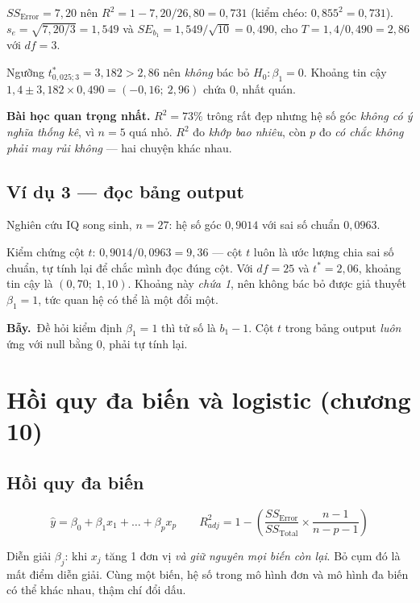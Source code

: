 \documentclass[11pt]{article}
\newcommand{\bay}{\textbf{Bẫy.}\ }
\begin{document}
$SS_{\text{Error}} = 7{,}20$ nên $R^2 = 1 - 7{,}20/26{,}80 = 0{,}731$
(kiểm chéo: $0{,}855^2 = 0{,}731$).
$s_e = \sqrt{7{,}20/3} = 1{,}549$ và $SE_{b_1} = 1{,}549/\sqrt{10} = 0{,}490$, cho
$T = 1{,}4/0{,}490 = 2{,}86$ với $df=3$.

Ngưỡng $t^{*}_{0{,}025;3} = 3{,}182 > 2{,}86$ nên \emph{không} bác bỏ
$H_0: \beta_1 = 0$. Khoảng tin cậy
$1{,}4 \pm 3{,}182 \times 0{,}490 = (-0{,}16;\ 2{,}96)$ chứa 0, nhất quán.

\textbf{Bài học quan trọng nhất.} $R^2 = 73\%$ trông rất đẹp nhưng hệ số góc
\emph{không có ý nghĩa thống kê}, vì $n=5$ quá nhỏ. $R^2$ đo \emph{khớp bao
nhiêu}, còn $p$ đo \emph{có chắc không phải may rủi không} --- hai chuyện khác nhau.

\subsection*{Ví dụ 3 --- đọc bảng output}

Nghiên cứu IQ song sinh, $n=27$: hệ số góc $0{,}9014$ với sai số chuẩn $0{,}0963$.

Kiểm chứng cột $t$: $0{,}9014/0{,}0963 = 9{,}36$ --- cột $t$ luôn là ước lượng chia
sai số chuẩn, tự tính lại để chắc mình đọc đúng cột. Với $df = 25$ và
$t^{*} = 2{,}06$, khoảng tin cậy là $(0{,}70;\ 1{,}10)$. Khoảng này \emph{chứa 1},
nên không bác bỏ được giả thuyết $\beta_1 = 1$, tức quan hệ có thể là một đổi một.

\bay Đề hỏi kiểm định $\beta_1 = 1$ thì tử số là $b_1 - 1$. Cột $t$ trong bảng
output \emph{luôn} ứng với null bằng 0, phải tự tính lại.

\section{Hồi quy đa biến và logistic (chương 10)}

\subsection*{Hồi quy đa biến}

\[
\hat y = \beta_0 + \beta_1 x_1 + \dots + \beta_p x_p
\qquad
R^2_{adj} = 1 - \left(\frac{SS_{\text{Error}}}{SS_{\text{Total}}} \times \frac{n-1}{n-p-1}\right)
\]

Diễn giải $\beta_j$: khi $x_j$ tăng 1 đơn vị \emph{và giữ nguyên mọi biến còn lại}.
Bỏ cụm đó là mất điểm diễn giải. Cùng một biến, hệ số trong mô hình đơn và mô hình
đa biến có thể khác nhau, thậm chí đổi dấu.
\end{document}
